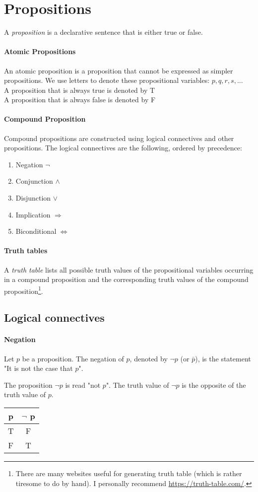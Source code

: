 \documentclass[10pt,a4paper]{book}
\begin{document}
\section{Propositions}
A \textit{proposition} is a declarative sentence that is either true or false.
\paragraph*{Atomic Propositions}
An atomic proposition is a proposition that cannot be expressed as simpler propositions. We use letters to denote these propositional variables: $p,q,r,s,...$\\
A proposition that is always true is denoted by T\\
A proposition that is always false is denoted by F
\paragraph*{Compound Proposition}
Compound propositions are constructed using logical connectives and other propositions. The logical connectives are the following, ordered by precedence:
\begin{enumerate}
\item Negation $\neg$
\item Conjunction $\land$
\item Disjunction $\lor$
\item Implication $\Rightarrow$
\item Biconditional $\Leftrightarrow$
\end{enumerate}
\paragraph*{Truth tables}
A \textit{truth table} lists all possible truth values of the propositional variables occurring in a compound proposition and the corresponding truth values of the compound proposition\footnote{There are many websites useful for generating truth table (which is rather tiresome to do by hand). I personally recommend \url{https://truth-table.com/}.}.
\subsection{Logical connectives}
\paragraph*{Negation}
Let $p$ be a proposition. The negation of $p$, denoted by $\neg p$ (or $\bar{p}$), is the statement "It is not the case that $p$".\par 
The proposition $\neg p$ is read "not $p$". The truth value of $\neg p$ is the opposite of the truth value of $p$. \\
\begin{tabular}{ |c | c| }
\hline
 p & $\neg$ p \\
 \hline 
 T & F \\  
 F & T \\
 \hline
\end{tabular}
\end{document}
